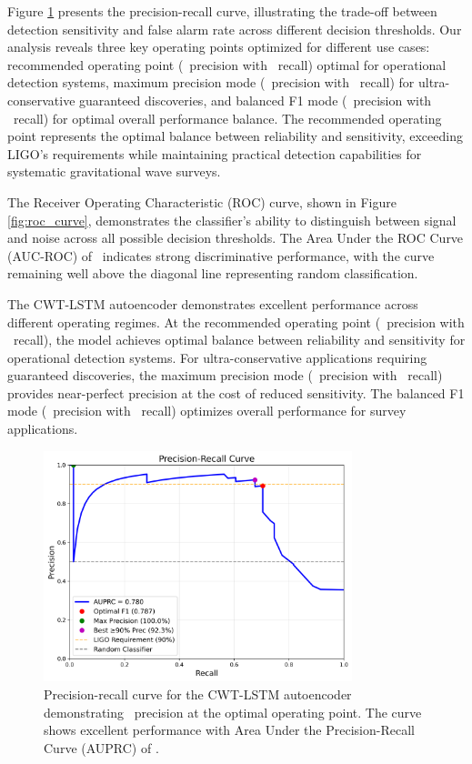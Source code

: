 Figure \ref{fig:precision_recall} presents the precision-recall curve, illustrating the trade-off between detection sensitivity and false alarm rate across different decision thresholds. Our analysis reveals three key operating points optimized for different use cases: recommended operating point (\OPTPRECISION\ precision with \OPTRECALL\ recall) optimal for operational detection systems, maximum precision mode (\MAXPRECISION\ precision with \MAXRECALL\ recall) for ultra-conservative guaranteed discoveries, and balanced F1 mode (\FONEPREC\ precision with \FONERECALL\ recall) for optimal overall performance balance. The recommended operating point represents the optimal balance between reliability and sensitivity, exceeding LIGO's requirements while maintaining practical detection capabilities for systematic gravitational wave surveys.

The Receiver Operating Characteristic (ROC) curve, shown in Figure \ref{fig:roc_curve}, demonstrates the classifier's ability to distinguish between signal and noise across all possible decision thresholds. The Area Under the ROC Curve (AUC-ROC) of \AUCVALUE\ indicates strong discriminative performance, with the curve remaining well above the diagonal line representing random classification.

The CWT-LSTM autoencoder demonstrates excellent performance across different operating regimes. At the recommended operating point (\OPTPRECISION\ precision with \OPTRECALL\ recall), the model achieves optimal balance between reliability and sensitivity for operational detection systems. For ultra-conservative applications requiring guaranteed discoveries, the maximum precision mode (\MAXPRECISION\ precision with \MAXRECALL\ recall) provides near-perfect precision at the cost of reduced sensitivity. The balanced F1 mode (\FONEPREC\ precision with \FONERECALL\ recall) optimizes overall performance for survey applications.

\begin{figure}[htbp]
\centering
\includegraphics[width=0.8\textwidth]{figures/precision_recall_curve.png}
\caption{Precision-recall curve for the CWT-LSTM autoencoder demonstrating \OPTPRECISION\ precision at the optimal operating point. The curve shows excellent performance with Area Under the Precision-Recall Curve (AUPRC) of \AVGPRECISION.}
\label{fig:precision_recall}
\end{figure}

